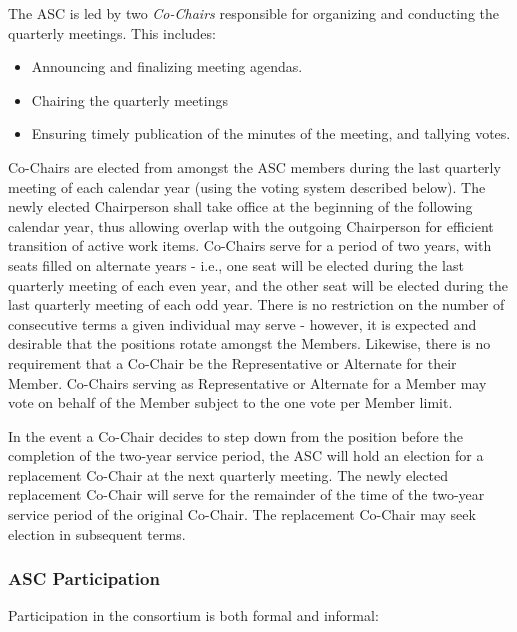 \documentclass{article}
\providecommand{\tightlist}{%
  \setlength{\itemsep}{0pt}\setlength{\parskip}{0pt}}
\begin{document}
The ASC is led by two \textit{Co-Chairs} responsible for organizing and
conducting the quarterly meetings. This includes:

\begin{itemize}
\tightlist
\item
  Announcing and finalizing meeting agendas.
\item
  Chairing the quarterly meetings
\item
  Ensuring timely publication of the minutes of the meeting, and
  tallying votes.
\end{itemize}

Co-Chairs are elected from amongst the ASC members during the last
quarterly meeting of each calendar year (using the voting system
described below). The newly elected Chairperson shall take office at the
beginning of the following calendar year, thus allowing overlap with the
outgoing Chairperson for efficient transition of active work items.
Co-Chairs serve for a period of two years, with seats filled on
alternate years - i.e., one seat will be elected during the last
quarterly meeting of each even year, and the other seat will be elected
during the last quarterly meeting of each odd year. There is no
restriction on the number of consecutive terms a given individual may
serve - however, it is expected and desirable that the positions rotate
amongst the Members. Likewise, there is no requirement that a Co-Chair
be the Representative or Alternate for their Member. Co-Chairs serving
as Representative or Alternate for a Member may vote on behalf of the
Member subject to the one vote per Member limit.

In the event a Co-Chair decides to step down from the position before
the completion of the two-year service period, the ASC will hold an
election for a replacement Co-Chair at the next quarterly meeting. The
newly elected replacement Co-Chair will serve for the remainder of the
time of the two-year service period of the original Co-Chair. The
replacement Co-Chair may seek election in subsequent terms.

\hypertarget{gov-asc-participation}{%
\subsubsection{ASC Participation}%
\label{gov-asc-participation}}

Participation in the consortium is both formal and informal:
\end{document}
